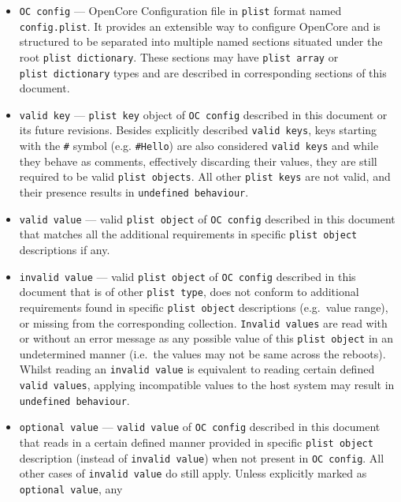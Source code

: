 \documentclass[]{article}
\begin{document}
\begin{itemize}
\item
  \texttt{OC\ config} --- OpenCore Configuration file in \texttt{plist}
  format named \texttt{config.plist}. It provides an extensible way
  to configure OpenCore and is structured to be separated into multiple
  named sections situated under the root \texttt{plist\ dictionary}. These
  sections may have \texttt{plist\ array} or
  \texttt{plist\ dictionary} types and are described in corresponding
  sections of this document.
\item
  \texttt{valid\ key} --- \texttt{plist\ key} object of
  \texttt{OC\ config} described in this document or its future
  revisions. Besides explicitly described \texttt{valid\ keys}, keys
  starting with the \texttt{\#} symbol (e.g. \texttt{\#Hello}) are also
  considered \texttt{valid\ keys} and while they behave as comments, effectively
  discarding their values, they are still required to be valid
  \texttt{plist\ objects}. All other \texttt{plist\ keys} are not valid,
  and their presence results in \texttt{undefined\ behaviour}.
\item
  \texttt{valid\ value} --- valid \texttt{plist\ object} of
  \texttt{OC\ config} described in this document that matches all the
  additional requirements in specific \texttt{plist\ object} descriptions
  if any.
\item
  \texttt{invalid\ value} --- valid \texttt{plist\ object} of
  \texttt{OC\ config} described in this document that is of other
  \texttt{plist\ type}, does not conform to additional requirements
  found in specific \texttt{plist\ object} descriptions (e.g.~value
  range), or missing from the corresponding collection.
  \texttt{Invalid\ values} are read with or without an error message as
  any possible value of this \texttt{plist\ object} in an undetermined
  manner (i.e.~the values may not be same across the reboots). Whilst
  reading an \texttt{invalid\ value} is equivalent to reading certain
  defined \texttt{valid\ values}, applying incompatible values to the host
  system may result in \texttt{undefined\ behaviour}.
\item
  \texttt{optional\ value} --- \texttt{valid\ value} of
  \texttt{OC\ config} described in this document that reads in a certain
  defined manner provided in specific \texttt{plist\ object} description
  (instead of \texttt{invalid\ value}) when not present in
  \texttt{OC\ config}. All other cases of \texttt{invalid\ value} do
  still apply. Unless explicitly marked as \texttt{optional\ value}, any

\end{itemize}
\end{document}
